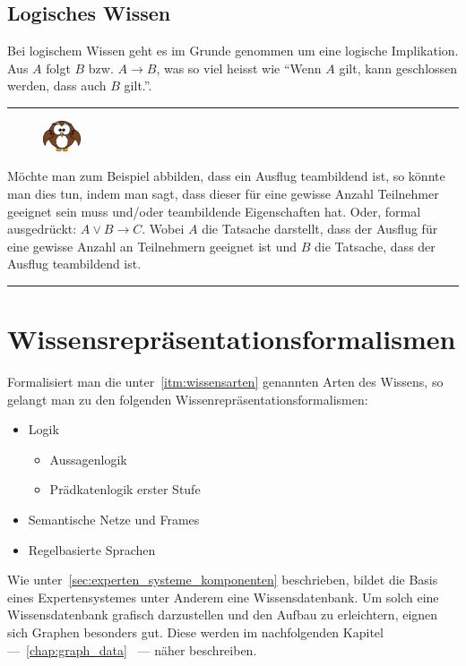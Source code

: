\subsection{Logisches Wissen}
\label{subsec:logisches_wissen}

Bei logischem Wissen geht es im Grunde genommen um eine logische Implikation. Aus $A$ folgt $B$ bzw. $A \to B$, was so viel heisst wie ``Wenn $A$ gilt, kann geschlossen werden, dass auch $B$ gilt.''.

\noindent\rule[1ex]{\textwidth}{1pt}
\begin{figure}
    \vspace{-14pt}
    \includegraphics[width=0.1\textwidth]{bilder/owl.png}
\end{figure}
Möchte man zum Beispiel abbilden, dass ein Ausflug teambildend ist, so könnte man dies tun, indem man sagt, dass dieser für eine gewisse Anzahl Teilnehmer geeignet sein muss und/oder teambildende Eigenschaften hat. Oder, formal ausgedrückt: $A \vee B \rightarrow C$. Wobei $A$ die Tatsache darstellt, dass der Ausflug für eine gewisse Anzahl an Teilnehmern geeignet ist und $B$ die Tatsache, dass der Ausflug teambildend ist.\\
\noindent\rule[1ex]{\textwidth}{1pt}

\section{Wissensrepräsentationsformalismen}
\label{sec:wissensrepräsentationsformalismen}

Formalisiert man die unter~\ref{itm:wissensarten} genannten Arten des Wissens, so gelangt man zu den folgenden Wissenrepräsentationsformalismen:
\begin{itemize}
    \item Logik
        \begin{itemize}
            \item Aussagenlogik
            \item Prädkatenlogik erster Stufe
        \end{itemize}
    \item Semantische Netze und Frames
    \item Regelbasierte Sprachen
\end{itemize}

Wie unter~\ref{sec:experten_systeme_komponenten} beschrieben, bildet die Basis eines Expertensystemes unter Anderem eine Wissensdatenbank. Um solch eine Wissensdatenbank grafisch darzustellen und den Aufbau zu erleichtern, eignen sich Graphen besonders gut. Diese werden im nachfolgenden Kapitel ---~\ref{chap:graph_data}~ --- näher beschreiben.

